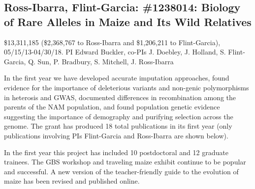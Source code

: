 
\subsection*{Ross-Ibarra, Flint-Garcia: \#1238014: Biology of Rare Alleles in Maize and Its Wild Relatives}
\$13,311,185 (\$2,368,767 to Ross-Ibarra and \$1,206,211 to Flint-Garcia), 05/15/13-04/30/18. PI Edward Buckler, co-PIs J. Doebley, J. Holland, S. Flint-Garcia, Q. Sun, P. Bradbury, S. Mitchell, J. Ross-Ibarra
\par{} In the first year we have developed accurate imputation approaches, found evidence for the importance of deleterious variants and non-genic polymorphisms in heterosis and GWAS, documented differences in recombination among the parents of the NAM population, and found population genetic evidence suggesting the importance of demography and purifying selection across the genome.  The grant has produced 18 total publications in its first year (only publications involving PIs Flint-Garcia and Ross-Ibarra are shown below). 
\par{}  In the first year this project has included 10 postdoctoral and 12 graduate trainees. The GBS workshop and traveling maize exhibit continue to be popular and successful. A new version of the teacher-friendly guide to the evolution of maize has been revised and published online. 
\par{} \citet{peiffer2013genetic, Romay2013, wills2013many, Mezmouk2014, Peiffer2014, sood2014mining}

